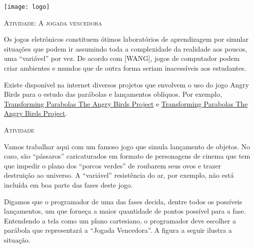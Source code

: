 \documentclass[10 pt,usenames,dvipsnames, oneside]{article}
\begin{document}
\begin{center}
  \begin{minipage}[l]{3cm}
\texttt{[image: logo]}    
\end{minipage}\hfill
\begin{minipage}[r]{.8\textwidth}
 {\Large \scshape Atividade: A jogada vencedora}  
\end{minipage}
\end{center}
\vspace{.2cm}

\ifdefined\prof

\begin{sugestions}

Os jogos eletrônicos constituem ótimos laboratórios de aprendizagem por simular situações que podem ir assumindo toda a complexidade da realidade aos poucos, uma “variável” por vez. De acordo com {[}WANG{]}, jogos de computador podem criar ambientes e mundos que de outra forma seriam inacessíveis aos estudantes.

Existe disponível na internet diversos projetos que envolvem o uso do jogo Angry Birds para o estudo das parábolas e lançamentos oblíquos. Por exemplo, \href{https://algebra2coach.com/transforming-parabolas-angry-birds-project/}{Transforming Parabolas \textendash{} The Angry Birds Project} e \href{https://www.tes.com/teaching-resource/angry-bird-parabolas-graphing-quadratic-equations-6165424}{Transforming Parabolas \textendash{} The Angry Birds Project}.
\end{sugestions}

\bigskip
\begin{center}
{\large \scshape Atividade}
\end{center}
\fi

Vamos trabalhar aqui com um famoso jogo que simula lançamento de objetos. No caso, são “pássaros” caricaturados em formato de personagens de cinema que tem que impedir o plano dos “porcos verdes” de roubarem seus ovos e trazer destruição ao universo. A “variável” resistência do ar, por exemplo, não está incluída em boa parte das fases deste jogo.

Digamos que o programador de uma das fases decida, dentre todos os possíveis lançamentos, um que forneça a maior quantidade de pontos possível para a fase. Entendendo a tela como um plano cartesiano, o programador deve escolher a parábola que representará a “Jogada Vencedora”. A figura a seguir ilustra a situação.
\end{document}
